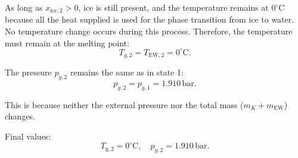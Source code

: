 As long as \( x_{\text{ice},2} > 0 \), ice is still present, and the temperature remains at \( 0^\circ\text{C} \) because all the heat supplied is used for the phase transition from ice to water. No temperature change occurs during this process. Therefore, the temperature must remain at the melting point:  
\[
T_{g,2} = T_{\text{EW},2} = 0^\circ\text{C}.
\]

The pressure \( p_{g,2} \) remains the same as in state 1:  
\[
p_{g,2} = p_{g,1} = 1.910 \, \text{bar}.
\]

This is because neither the external pressure nor the total mass (\( m_K + m_{\text{EW}} \)) changes.  

Final values:  
\[
T_{g,2} = 0^\circ\text{C}, \quad p_{g,2} = 1.910 \, \text{bar}.
\]